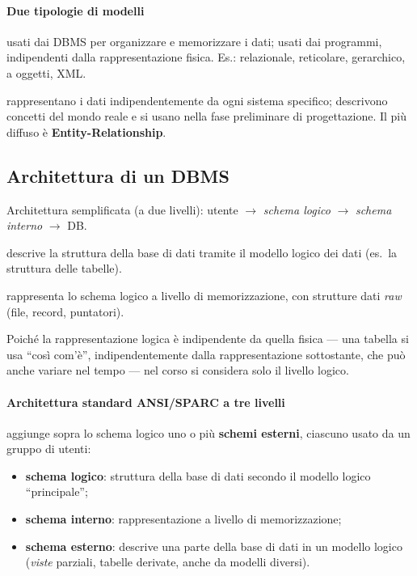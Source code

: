 \documentclass[a4paper,12pt]{article}
\begin{document}
\paragraph{Due tipologie di modelli}
\begin{description}[style=nextline]
  \item[Modelli logici] usati dai DBMS per organizzare e memorizzare i dati;
    usati dai programmi, indipendenti dalla rappresentazione fisica. Es.:
    relazionale, reticolare, gerarchico, a oggetti, XML.
  \item[Modelli concettuali] rappresentano i dati indipendentemente da ogni
    sistema specifico; descrivono concetti del mondo reale e si usano nella fase
    preliminare di progettazione. Il più diffuso è \textbf{Entity-Relationship}.
\end{description}

\subsection{Architettura di un DBMS}

Architettura semplificata (a due livelli): utente $\to$ \emph{schema logico}
$\to$ \emph{schema interno} $\to$ DB.

\begin{description}[style=nextline]
  \item[Schema logico] descrive la struttura della base di dati tramite il
    modello logico dei dati (es.\ la struttura delle tabelle).
  \item[Schema interno (o fisico)] rappresenta lo schema logico a livello di
    memorizzazione, con strutture dati \emph{raw} (file, record, puntatori).
\end{description}

Poiché la rappresentazione logica è indipendente da quella fisica --- una tabella
si usa ``così com'è'', indipendentemente dalla rappresentazione sottostante, che
può anche variare nel tempo --- nel corso si considera solo il livello logico.

\paragraph{Architettura standard ANSI/SPARC a tre livelli} aggiunge sopra lo
schema logico uno o più \textbf{schemi esterni}, ciascuno usato da un gruppo di
utenti:
\begin{itemize}
  \item \textbf{schema logico}: struttura della base di dati secondo il modello
    logico ``principale'';
  \item \textbf{schema interno}: rappresentazione a livello di memorizzazione;
  \item \textbf{schema esterno}: descrive una parte della base di dati in un
    modello logico (\emph{viste} parziali, tabelle derivate, anche da modelli
    diversi).
\end{itemize}
\end{document}
